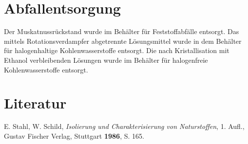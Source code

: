 \documentclass[12pt]{article}
\begin{document}
\begin{onehalfspace}
\section{Abfallentsorgung}
Der Muskatnussrückstand wurde im Behälter für Feststoffabfälle entsorgt. Das mittels Rotationsverdampfer abgetrennte Lösungsmittel wurde in dem Behälter für halogenhaltige Kohlenwasserstoffe entsorgt. Die nach Kristallisation mit Ethanol verbleibenden Lösungen wurde im Behälter für halogenfreie Kohlenwasserstoffe entsorgt.
\section{Literatur}
\renewcommand{\section}[2]{}%
\begin{thebibliography}{}
 E. Stahl, W. Schild, \textit{Isolierung und Charakterisierung von Naturstoffen}, 1. Aufl., Gustav Fischer Verlag, Stuttgart \textbf{1986}, S. 165.
\end{thebibliography}
\end{onehalfspace}
\end{document}

